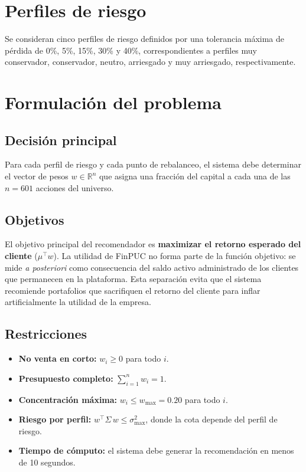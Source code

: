 \section{Perfiles de riesgo}

Se consideran cinco perfiles de riesgo definidos por una tolerancia m\'axima de p\'erdida de 0\%, 5\%, 15\%, 30\% y 40\%, correspondientes a perfiles muy conservador, conservador, neutro, arriesgado y muy arriesgado, respectivamente.

\section{Formulaci\'on del problema}

\subsection{Decisi\'on principal}

Para cada perfil de riesgo y cada punto de rebalanceo, el sistema debe
determinar el vector de pesos $w \in \mathbb{R}^n$ que asigna una fracci\'on
del capital a cada una de las $n = 601$ acciones del universo.

\subsection{Objetivos}

El objetivo principal del recomendador es \textbf{maximizar el retorno esperado
del cliente} ($\mu^\top w$). La utilidad de FinPUC no forma parte de la funci\'on
objetivo: se mide \emph{a posteriori} como consecuencia del saldo activo
administrado de los clientes que permanecen en la plataforma. Esta separaci\'on
evita que el sistema recomiende portafolios que sacrifiquen el retorno del
cliente para inflar artificialmente la utilidad de la empresa.
    
\subsection{Restricciones}
\begin{itemize}
    \item \textbf{No venta en corto:} $w_i \geq 0$ para todo $i$.
    \item\textbf{Presupuesto completo:} $\sum_{i=1}^{n} w_i = 1$.
    \item\textbf{Concentraci\'on m\'axima:} $w_i \leq w_{\max} = 0.20$ para todo $i$.
    \item\textbf{Riesgo por perfil:} $w^\top \Sigma\, w \leq \sigma_{\max}^2$, donde la cota depende del perfil de riesgo.
    \item\textbf{Tiempo de c\'omputo:} el sistema debe generar la recomendaci\'on en menos de 10 segundos.
\end{itemize}


